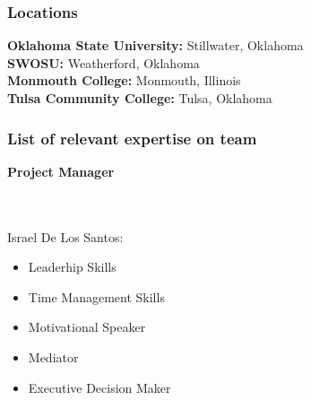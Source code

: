 \documentclass[%
 portrait,
 aapm,
 mph,%
 amsmath,amssymb,
 reprint,%
]{revtex4-2}
\begin{document}
\subsubsection{Locations}
\textbf{Oklahoma State University:} Stillwater, Oklahoma \\ 
\textbf{SWOSU:} Weatherford, Oklahoma\\ 
\textbf{Monmouth College: }Monmouth, Illinois \\ 
\textbf{Tulsa Community College:} Tulsa, Oklahoma \\ 
\subsubsection{List of relevant expertise on team}
\begin{Large}\textbf{Project Manager}\end{Large}\\ \\
Israel De Los Santos:
\begin{itemize}
    \item Leaderhip Skills
    \item Time Management Skills
    \item Motivational Speaker
    \item Mediator
    \item Executive Decision Maker
\end{itemize}
\end{document}
